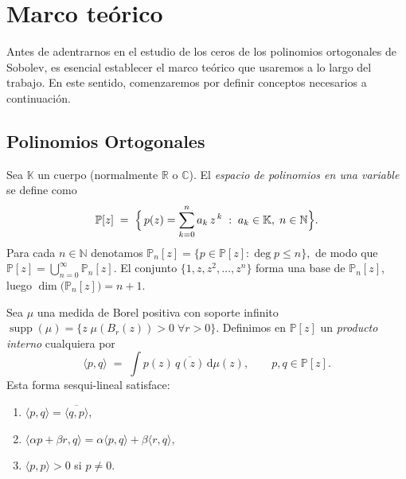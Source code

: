 \chapter{Marco teórico}
\label{ch:marco-teorico}

Antes de adentrarnos en el estudio de los ceros de los polinomios ortogonales de Sobolev, es esencial establecer el marco teórico que usaremos a lo largo del trabajo. En este sentido, comenzaremos por definir conceptos necesarios a continuación.

\section{Polinomios Ortogonales}

\begin{definition}\label{def:espacio-polinomios}
  Sea $\mathbb{K}$ un cuerpo (normalmente $\mathbb{R}$ o $\mathbb{C}$).
  El \emph{espacio de polinomios en una variable} se define como
  \[
    \mathbb{P}[z]\;=\;
    \Bigl\{\,p(z)=\sum_{k=0}^{n} a_k\,z^{\,k}\;:\;
    a_k\in\mathbb{K},\;n\in\mathbb{N}\Bigr\}.
  \]
  Para cada $n\in\mathbb{N}$ denotamos
  $
    \mathbb{P}_{n}[z]=\{p\in\mathbb{P}[z]:\deg p\le n\},
  $
  de modo que $\mathbb{P}[z]=\bigcup_{n=0}^{\infty}\mathbb{P}_{n}[z]$.
  El conjunto $\{1,z,z^{2},\dots,z^{n}\}$ forma una base de
  $\mathbb{P}_{n}[z]$, luego $\dim\!\bigl(\mathbb{P}_{n}[z]\bigr)=n+1$.
\end{definition}

\begin{definition}\label{def:producto-interno-general-medida}
  Sea $\mu$ una medida de Borel positiva con soporte infinito $\operatorname{supp}(\mu)=\{z\;\mu(B_r(z))>0\;\forall r>0\}$. Definimos en $\mathbb{P}[z]$ un \emph{producto interno} cualquiera por
  \[
    \langle p,q\rangle
    \;=\;
    \int p(z)\,\overline{q(z)}\,\mathrm d\mu(z),
    \qquad p,q\in\mathbb{P}[z].
  \]
  Esta forma sesqui-lineal satisface:
  \begin{enumerate}
    \item $\langle p,q\rangle=\overline{\langle q,p\rangle}$,
    \item $\langle \alpha p+\beta r,q\rangle
            =\alpha\langle p,q\rangle+\beta\langle r,q\rangle$,
    \item $\langle p,p\rangle>0$ si $p\neq0$.
  \end{enumerate}
\end{definition}

